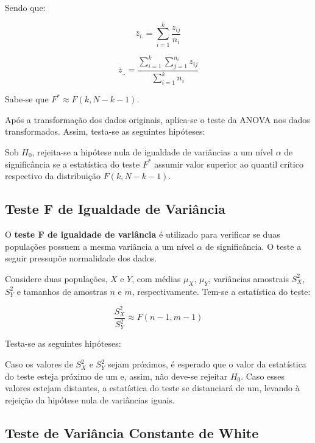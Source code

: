 \documentclass[
  portuguese,
]{estat/estat}
\begin{document}
Sendo que:

\[ \bar{z}_{i.} = \sum_{i=1}^{k}\frac{z_{ij}}{n_{i}} \]

\[ \bar{z}_{..} = \frac{\displaystyle \sum_{i=1}^{k}\displaystyle\sum_{j=1}^{n_i}z_{ij}}{\displaystyle\sum_{i=1}^{k}n_i} \]

Sabe-se que \(F^* \approx F(k,N-k-1)\).

Após a transformação dos dados originais, aplica-se o teste da ANOVA nos
dados transformados. Assim, testa-se as seguintes hipóteses:


Sob \(H_0\), rejeita-se a hipótese nula de igualdade de variâncias a um
nível \(\alpha\) de significância se a estatística do teste \(F^*\)
assumir valor superior ao quantil crítico respectivo da distribuição
\(F(k,N-k-1)\).

\subsection{Teste F de Igualdade de
Variância}\label{teste-f-de-igualdade-de-variuxe2ncia}

O \textbf{teste F de igualdade de variância} é utilizado para verificar
se duas populações possuem a mesma variância a um nível \(\alpha\) de
significância. O teste a seguir pressupõe normalidade dos dados.

Considere duas populações, \(X\) e \(Y\), com médias \(\mu_X\),
\(\mu_Y\), variâncias amostrais \(S^2_X\), \(S^2_Y\) e tamanhos de
amostras \(n\) e \(m\), respectivamente. Tem-se a estatística do teste:

\[ \frac{S^2_X}{S^2_Y} \approx F(n - 1, m - 1) \]

Testa-se as seguintes hipóteses:


Caso os valores de \(S^2_X\) e \(S^2_Y\) sejam próximos, é esperado que
o valor da estatística do teste esteja próximo de um e, assim, não
deve-se rejeitar \(H_0\). Caso esses valores estejam distantes, a
estatística do teste se distanciará de um, levando à rejeição da
hipótese nula de variâncias iguais.

\subsection{Teste de Variância Constante de
White}\label{teste-de-variuxe2ncia-constante-de-white}
\end{document}
